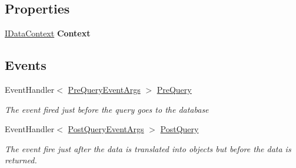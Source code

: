 \subsection*{Properties}
\begin{DoxyCompactItemize}
\item 
\hypertarget{class_highway_1_1_data_1_1_query_objects_1_1_query_base_aa8ca309734c39e9e78853e2a76c041f1}{\hyperlink{interface_highway_1_1_data_1_1_interfaces_1_1_i_data_context}{I\-Data\-Context} {\bfseries Context}}\label{class_highway_1_1_data_1_1_query_objects_1_1_query_base_aa8ca309734c39e9e78853e2a76c041f1}

\end{DoxyCompactItemize}
\subsection*{Events}
\begin{DoxyCompactItemize}
\item 
Event\-Handler$<$ \hyperlink{class_highway_1_1_data_1_1_interceptors_1_1_events_1_1_pre_query_event_args}{Pre\-Query\-Event\-Args} $>$ \hyperlink{class_highway_1_1_data_1_1_query_objects_1_1_query_base_a0f4a7c6fcd8e32c461633855ed00f824}{Pre\-Query}
\begin{DoxyCompactList}\small\item\em The event fired just before the query goes to the database \end{DoxyCompactList}\item 
Event\-Handler$<$ \hyperlink{class_highway_1_1_data_1_1_interceptors_1_1_events_1_1_post_query_event_args}{Post\-Query\-Event\-Args} $>$ \hyperlink{class_highway_1_1_data_1_1_query_objects_1_1_query_base_a75da4f1ac849eac015645365f982a9ff}{Post\-Query}
\begin{DoxyCompactList}\small\item\em The event fire just after the data is translated into objects but before the data is returned. \end{DoxyCompactList}\end{DoxyCompactItemize}


